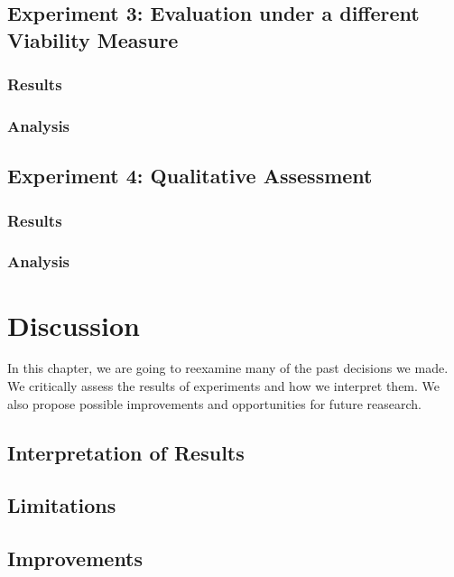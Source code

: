 \documentclass[12pt,a4paper]{report}
\begin{document}
\section{Experiment 3: Evaluation under a different Viability Measure}
\label{sec:experiment3}
\subsection{Results}

\subsection{Analysis}


\section{Experiment 4: Qualitative Assessment}
\label{sec:experiment4}
\subsection{Results}

\subsection{Analysis}



\chapter{Discussion}
\label{ch:dicussion}
In this chapter, we are going to reexamine many of the past decisions we made. We critically assess the results of experiments and how we interpret them. We also propose possible improvements and opportunities for future reasearch.

\section{Interpretation of Results}


\section{Limitations}


\section{Improvements}

\end{document}
